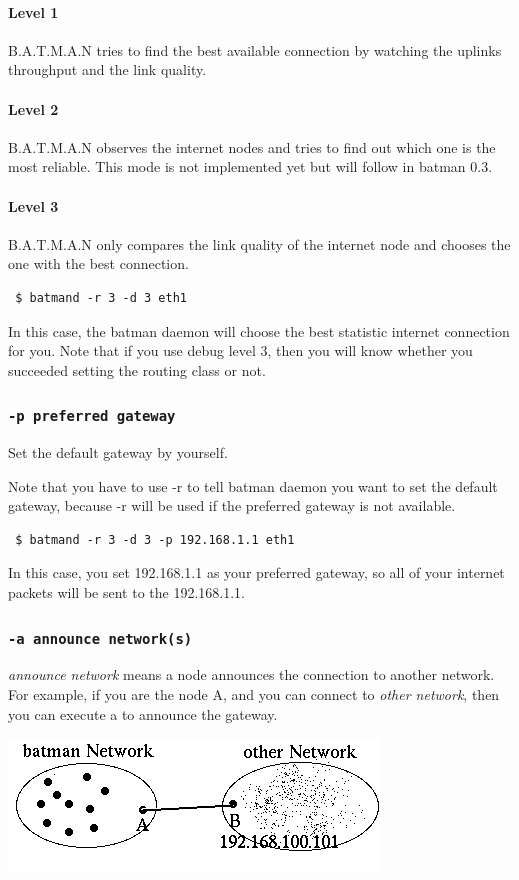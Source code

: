 \documentclass[
	12pt,
	a4paper,
	twoside,
	english,
	headsepline,
	footnosepline,
	automark,
	normalheadings,
	openany,
	cleardoubleplain,
	abstracton,
	idxtotoc,
	liststotoc,
	bibtotoc,
 	BCOR8mm,
]{scrartcl}
\newcommand{\subsubsectionttt}[1]{\subsubsection{\texttt{#1}}}
\begin{document}
\paragraph*{Level 1}
B.A.T.M.A.N tries to find the best available connection by watching the uplinks  throughput and the link quality.

\paragraph*{Level 2}
B.A.T.M.A.N observes the internet nodes and tries to find out which one is the  most reliable. This mode is not implemented yet but will follow in batman 0.3.

\paragraph*{Level 3}
B.A.T.M.A.N only compares the link quality of the internet node and chooses the  one with the best connection.

\begin{verbatim}
 $ batmand -r 3 -d 3 eth1
\end{verbatim}
In this case, the batman daemon will choose the best statistic internet connection for you. Note that if you use debug level 3, then you will know whether you succeeded setting the  routing class or not.

\subsubsectionttt{-p preferred gateway}
Set the default gateway  by yourself.

Note that you have to use -r to tell batman daemon you want to set the default gateway,  because  -r will be used if the preferred gateway is not available.

\begin{verbatim}
 $ batmand -r 3 -d 3 -p 192.168.1.1 eth1
\end{verbatim}
In this case, you set 192.168.1.1 as your preferred gateway, so all of your internet packets will  be sent to the 192.168.1.1.

\subsubsectionttt{-a announce network(s)}
\emph{announce network} means a node announces the connection to another network. For example, if you are the node A, and you can connect to \emph{other network}, then you can  execute  a to announce the gateway.

\begin{center}
\includegraphics[scale=0.8]{announce_networks}
\end{center}
\end{document}
